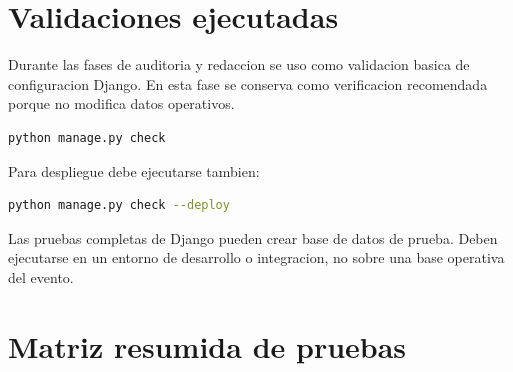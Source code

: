 \section{Validaciones ejecutadas}
\label{sec:pruebas-validaciones}

Durante las fases de auditoria y redaccion se uso  como validacion basica de configuracion Django. En esta fase se conserva como verificacion recomendada porque no modifica datos operativos.

\begin{lstlisting}[language=bash,caption={Comando de verificacion Django recomendado.},label={lst:pruebas-manage-check}]
python manage.py check
\end{lstlisting}

Para despliegue debe ejecutarse tambien:

\begin{lstlisting}[language=bash,caption={Comando de verificacion para despliegue.},label={lst:pruebas-check-deploy}]
python manage.py check --deploy
\end{lstlisting}

Las pruebas completas de Django pueden crear base de datos de prueba. Deben ejecutarse en un entorno de desarrollo o integracion, no sobre una base operativa del evento.

\section{Matriz resumida de pruebas}
\label{sec:pruebas-matriz}

